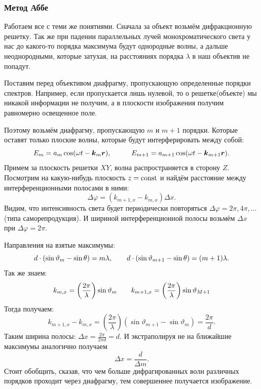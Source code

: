 \subsubsection{Метод Аббе}
Работаем все с теми же понятиями. 
Сначала за объект возьмём дифракционную решетку. 
Так же при падении параллельных лучей монохроматического света у нас до какого-то порядка максимума будут однородные волны, а дальше неоднородными, которые затухая, на расстояниях порядка $\lambda$ в наш объектив не попадут.

Поставим перед объективом диафрагму, пропускающую определенные порядки спектров. Например, если пропускается лишь нулевой, то о решетке(объекте) мы никакой информации не получим, а в плоскости изображения получим равномерно освещенное поле.

Поэтому возьмём диафрагму, пропускающую $m$ и $m+1$ порядки. Которые оставят только плоские волны, которые будут интерферировать между собой:
\begin{equation*}
	E_m = a_m \cos (\omega t - \mbox{\boldmath $k$}_m \mbox{\boldmath $r$}),
	\hspace{1 cm}
	E_{m+1} = a_{m+1} \cos (\omega t - \mbox{\boldmath $k$}_{m+1} \mbox{\boldmath $r$}).
\end{equation*}
Примем за плоскость решетки $XY$, волна распространяется в сторону $Z$. Посмотрим на какую-нибудь плоскость $z = \text{const}$ и найдём расстояние между интерференционными полосами в ними:
\begin{equation*}
	\Delta \varphi = (k_{m+1, x} - k_{m, x}) \Delta x.
\end{equation*}
Видим, что интенсивность света будет периодически повторяться $\Delta \varphi = 2 \pi, 4 \pi, \ldots$ (типа саморепродукция). И шириной интерференционной полосы возьмём $\Delta x$ при $\Delta \varphi = 2 \pi$.

Направления на взятые максимумы:
\begin{equation*}
	d \cdot (\sin \vartheta_m -  \sin \theta) = m \lambda,
	\hspace{0.7 cm}
	d \cdot (\sin \vartheta_{m+1} -  \sin \theta) = (m+1) \lambda.
\end{equation*}
Так же знаем:
\begin{equation*}
	k_{m, x} = \left(\frac{2 \pi}{\lambda}\right) \sin \vartheta_m
	\hspace{0.7 cm}
	k_{m+1, x} = \left(\frac{2 \pi}{\lambda}\right) \sin \vartheta_{M+1}
\end{equation*}
Тогда получаем:
\begin{equation*}
	k_{m+1, x} - k_{m, x} = \left(\frac{2 \pi}{\lambda}\right)(\sin \vartheta_{m+1} - \sin \vartheta_m) = \frac{2 \pi}{d}.
\end{equation*}
Таким ширина полосы: $\Delta x = \frac{2 \pi}{2\pi d} = d$.
И экстраполируя не на ближайшие максимумы аналогично получаем
\begin{equation*}
	\Delta x = \frac{d}{\Delta m}.
\end{equation*}
Стоит обобщить, сказав, что чем больше дифрагированных волн различных порядков проходит через диафрагму, тем совершеннее получается изображение.

